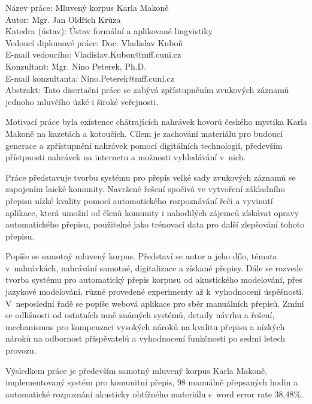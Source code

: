 \noindent Název práce: Mluven\'{y} korpus Karla Makon\v{e}\\
Autor: Mgr. Jan Oldřich Krůza\\
Katedra (ústav): Ústav formální a aplikované lingvistiky\\
Vedoucí diplomové práce: Doc. Vladislav Kuboň\\
E-mail vedoucího: Vladislav.Kubon@mff.cuni.cz\\
Konzultant: Mgr. Nino Peterek, Ph.D.\\
E-mail konzultanta: Nino.Peterek@mff.cuni.cz\\

\noindent Abstrakt: Tato disertační práce se zabývá zpřístupněním zvukových
záznamů jednoho mluvčího úzké i široké veřejnosti.

Motivací práce byla existence chátrajících nahrávek hovorů českého mystika
Karla Makoně na kazetách a kotoučích. Cílem je zachování materiálu pro
budoucí generace a zpřístupnění nahrávek pomocí digitálních technologií,
především přístpnosti nahrávek na internetu a možnosti vyhledávání v~nich.

Práce představuje tvorbu systému pro přepis velké sady zvukových záznamů
se zapojením laické komunity. Navržené řešení spočívá ve vytvoření základního
přepisu nízké kvality pomocí automatického rozpoznávání řeči a vyvinutí
aplikace, která umožní od členů komunity i nahodilých zájemců získávat opravy
automatického přepisu, použitelné jako trénovací data pro další zlepšování
tohoto přepisu.

Popíše se samotný mluvený korpus. Představí se autor a
jeho dílo,
témata v~nahrávkách, nahrávání samotné, digitalizace a získané přepisy.
Dále se rozvede tvorba systému pro automatický
přepis korpusu od akustického modelování, přes jazykové modelování, různé
provedené experimenty až k~vyhodnocení úspěšnosti. V~neposlední řadě se popíše
webová aplikace pro sběr manuálních přepisů. Zmíní se odlišnosti od ostatních mně známých
systémů, detaily návrhu a řešení, mechanismus pro kompenzaci vysokých nároků na kvalitu
přepisu a nízkých nároků na odbornost přispěvatelů a vyhodnocení funkčnosti
po sedmi letech provozu.

Výsledkem práce je především samotný mluvený korpus Karla Makoně,
implementovaný systém pro komunitní přepis, 98 manuálně
přepsaných hodin a automatické rozpoznání akusticky obtížného materiálu
s~word error rate 38,48\%.

\vspace{10mm}

